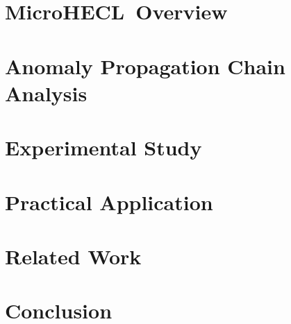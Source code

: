 \documentclass[10pt,conference]{IEEEtran}
\newcommand\app{MicroHECL}
\begin{document}
\section{\app~Overview}\label{sec:overview}


\section{Anomaly Propagation Chain Analysis}\label{sec:propagation}


\section{Experimental Study}


\section{Practical Application}


\section{Related Work}


\section{Conclusion}





\end{document}

